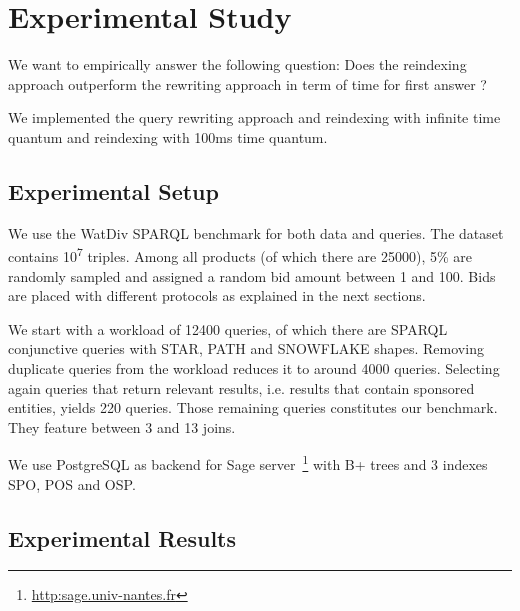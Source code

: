 \documentclass[runningheads]{llncs}
\begin{document}
\section{Experimental Study}
\label{sec:experimental-study}

We want to empirically answer the following question: 
Does the reindexing approach outperform the rewriting approach in term of time for first answer ?

%

We implemented the query rewriting approach and reindexing  
with infinite time quantum and reindexing with 100ms time quantum.


\subsection{Experimental Setup}

We use the WatDiv \cite{DBLP:conf/sigmod/GaoGOA18} SPARQL benchmark
for both data and queries. The dataset contains 10\textsuperscript{7}
triples.  Among all products (of which there are 25000), 5\% are
randomly sampled and assigned a random bid amount between 1 and
100. Bids are placed with different protocols as explained in the next
sections.

We start with a workload of 12400 queries, of which there are SPARQL
conjunctive queries with STAR, PATH and SNOWFLAKE shapes. Removing
duplicate queries from the workload reduces it to around 4000 queries.
 Selecting again queries that return relevant results,
i.e. results that contain sponsored entities, yields 220
queries. Those remaining queries constitutes our benchmark.  
They  feature between 3 and 13 joins.

We use PostgreSQL as backend  for Sage server~\footnote{\url{http:sage.univ-nantes.fr}} with B+ trees and 3 indexes 
SPO, POS and OSP.  %


\subsection{Experimental Results}
\end{document}
